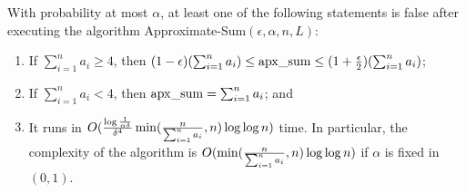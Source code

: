 \documentclass[runningheads]{llncs}
\newcommand{\appsum}{{\rm apx\_sum}}
\begin{document}
\begin{lemma}\label{app-sum-lemma} With probability at most
$\alpha$, at least one of the following statements is false after
executing the algorithm Approximate-Sum$(\epsilon,  \alpha, n, L)$:
\begin{enumerate}[1.]
\item\label{item3b-app-sum-lemma}
If $\sum_{i=1}^na_i\ge 4$, then $(1-\epsilon)(\sum_{i=1}^na_i)\le
\appsum\le (1+{\epsilon\over 2})(\sum_{i=1}^na_i)$;
\item\label{item3c-app-sum-lemma}
If $\sum_{i=1}^na_i< 4$, then $\appsum=\sum_{i=1}^na_i$; and
\item\label{item4-app-sum-lemma}
It runs in $O({\log {1\over \alpha\delta}\over \delta^4}\min({n\over
\sum_{i=1}^n a_i},n)\log\log n)$ time. In particular, the complexity
of the algorithm is $O(\min({n\over \sum_{i=1}^n a_i},n)\log\log n)$
if $\alpha$ is fixed in $(0,1)$.
\end{enumerate}
\end{lemma}
\end{document}
